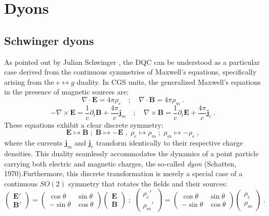 \documentclass[a4paper,11pt]{article}
\begin{document}
\section{Dyons}
\subsection{Schwinger dyons}
As pointed out by Julian Schwinger \cite{doi:10.1126/science.165.3895.757}, the DQC can be understood as a particular case derived from the continuous symmetries of Maxwell's equations, specifically arising from the $e \leftrightarrow g$ duality. In CGS units, the generalized Maxwell's equations in the presence of magnetic sources are:
$$\nabla \cdot \boldsymbol{E} = 4\pi\rho_e \quad ; \quad \nabla \cdot \boldsymbol{B} = 4\pi\rho_m \ .$$
$$-\nabla \times \boldsymbol{E} = \frac{1}{c}\partial_t \boldsymbol{B} +\frac{4\pi}{c} \boldsymbol{j}_m \quad ; \quad \nabla \times \boldsymbol{B} =\frac{1}{c} \partial_t \boldsymbol{E}+ \frac{4\pi}{c} \boldsymbol{j}_e\ . $$
These equations exhibit a clear discrete symmetry:
\begin{equation}
    \boldsymbol{E} \mapsto \boldsymbol{B} \; ; \; \boldsymbol{B} \mapsto -\boldsymbol{E} \; , \; \rho_e \mapsto \rho_m \; ; \; \rho_m \mapsto -\rho_e\ ,
\end{equation}
where the currents $\boldsymbol{j}_m$ and $\boldsymbol{j}_e$ transform identically to their respective charge densities. This duality seamlessly accommodates the dynamics of a point particle carrying both electric and magnetic charges, the so-called \textit{dyon} (Schatten, 1970).Furthermore, this discrete transformation is merely a special case of a continuous $SO(2)$ symmetry that rotates the fields and their sources:
\begin{equation}
    \begin{pmatrix} \boldsymbol{E}' \\ \boldsymbol{B}' \end{pmatrix} = \begin{pmatrix} \cos\theta & \sin\theta \\ -\sin\theta & \cos\theta \end{pmatrix} \begin{pmatrix} \boldsymbol{E} \\ \boldsymbol{B} \end{pmatrix} \; ; \; \begin{pmatrix} \rho_e' \\ \rho_m' \end{pmatrix} = \begin{pmatrix} \cos\theta & \sin\theta \\ -\sin\theta & \cos\theta \end{pmatrix} \begin{pmatrix} \rho_e \\ \rho_m \end{pmatrix}\ .
\end{equation}
\end{document}
